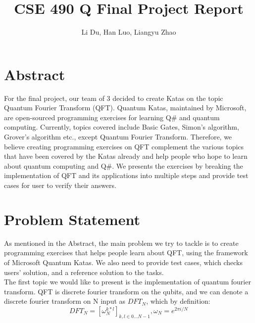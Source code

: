 \documentclass[a4paper]{article}
\title{CSE 490 Q Final Project Report}
\author{Li Du, Han Luo, Liangyu Zhao}
\begin{document}
\maketitle
\section*{{Abstract}}

For the final project, our team of 3 decided to create Katas on the topic Quantum Fourier Transform (QFT). Quantum Katas, maintained by Microsoft, are open-sourced programming exercises for learning Q\# and quantum computing. Currently, topics covered include Basic Gates, Simon's algorithm, Grover's algorithm etc., except Quantum Fourier Transform. Therefore, we believe creating programming exercises on QFT complement the various topics that have been covered by the Katas already and help people who hope to learn about quantum computing and Q\#. We presents the exercises by breaking the implementation of QFT and its applications into multiple steps and provide test cases for user to verify their answers. \\

\section*{{Problem Statement}}
As mentioned in the Abstract, the main problem we try to tackle is to create programming exercises that helps people learn about QFT, using the framework of Microsoft Quantum Katas. We also need to provide test cases, which checks users' solution, and a reference solution to the tasks. \\

The first topic we would like to present is the implementation of quantum fourier transform. QFT is discrete fourier transform on the qubits, and we can denote a discrete fourier transform on N input as $DFT_N$, which by definition:
$$DFT_N = [\omega_{N}^{k*l}]_{k,l \in 0 ... N - 1}, \omega_N = e^{2 \pi i / N}$$
\end{document}
